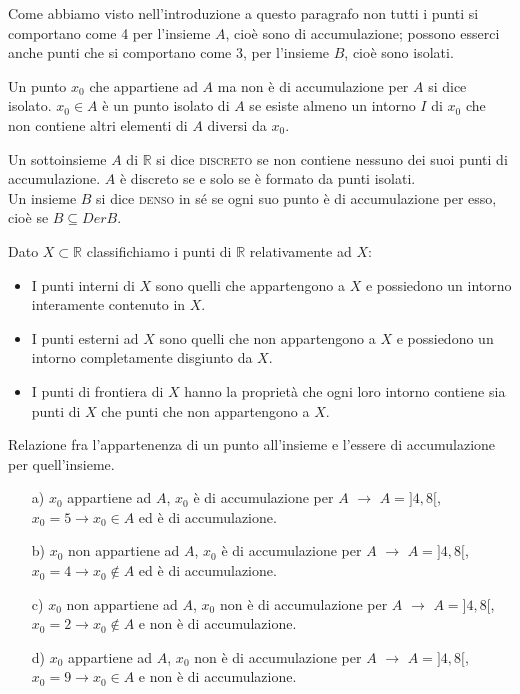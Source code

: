 Come abbiamo visto nell'introduzione a questo paragrafo non tutti i punti si 
comportano come 4 per l'insieme \(A\), cioè sono di accumulazione; possono 
esserci anche punti che si comportano come 3, per l'insieme \(B\), cioè sono 
isolati.

\begin{definizione}
  Un punto \(x_0\) che appartiene ad \(A\) ma non è di accumulazione per \(A\) 
si dice isolato. \(x_0\in A\) è un punto isolato di \(A\) se esiste almeno un 
intorno \(I\) di \(x_0\) che non contiene altri elementi di \(A\) diversi da 
\(x_0\).
\end{definizione}

Un sottoinsieme \(A\) di \(\mathbb{R}\) si dice \textsc{discreto} se non contiene 
nessuno dei suoi punti di accumulazione. \(A\) è discreto se e solo se è 
formato da punti isolati.\\
Un insieme \(B\) si dice \textsc{denso} in sé se ogni suo punto è di 
accumulazione per esso, cioè se \(B\subseteq Der B\).

Dato \(X\subset \mathbb{R}\) classifichiamo i punti di \(\mathbb{R}\) 
relativamente ad \(X\):
\begin{itemize}
  \item I punti interni di \(X\) sono quelli che appartengono a \(X\) e 
possiedono un intorno interamente contenuto in \(X\).
  \item   I punti esterni ad \(X\) sono quelli che non appartengono a \(X\) 
e possiedono un intorno completamente disgiunto da \(X\).
  \item   I punti di frontiera di \(X\) hanno la proprietà che ogni loro 
intorno contiene sia punti di \(X\) che punti che non appartengono a \(X\).
\end{itemize}

\begin{esempio}
Relazione fra l'appartenenza di un punto all'insieme e l'essere di 
accumulazione per quell'insieme.
\begin{itemize}
  \item[a)] \(x_0\) appartiene ad \(A\), \(x_0\) è di accumulazione per \(A\)
 \(\longrightarrow\) \(A=]4,8[\), \(x_0=5\rightarrow x_0\in A\) ed è di 
accumulazione.
  \item[b)]  \(x_0\) non appartiene ad \(A\), \(x_0\) è di accumulazione per 
\(A\)
 \(\longrightarrow\) \(A=]4,8[\), \(x_0=4\rightarrow x_0\notin A\) ed è di 
accumulazione.
  \item[c)]  \(x_0\) non appartiene ad \(A\), \(x_0\) non è di accumulazione 
per \(A\)
 \(\longrightarrow\) \(A=]4,8[\), \(x_0=2\rightarrow x_0\notin A\) e non è di 
accumulazione.
  \item[d)] \(x_0\) appartiene ad \(A\), \(x_0\) non è di accumulazione per 
\(A\)
  \(\longrightarrow\) \(A=]4,8[\), \(x_0=9\rightarrow x_0\in A\) e non 
è di accumulazione.
\end{itemize}
\end{esempio}

